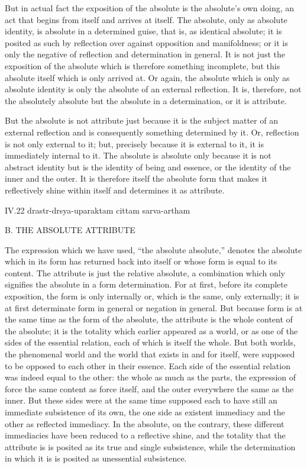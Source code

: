 But in actual fact
the exposition of the absolute
is the absolute's own doing,
an act that begins from itself
and arrives at itself.
The absolute, only as absolute identity,
is absolute in a determined guise,
that is, as identical absolute;
it is posited as such by reflection
over against opposition and manifoldness;
or it is only the negative of
reflection and determination in general.
It is not just the exposition of the absolute
which is therefore something incomplete,
but this absolute itself
which is only arrived at.
Or again, the absolute
which is only as absolute identity
is only the absolute of an external reflection.
It is, therefore, not the absolutely absolute
but the absolute in a determination,
or it is attribute.

But the absolute is not attribute just because
it is the subject matter of an external reflection
and is consequently something determined by it.
Or, reflection is not only external to it;
but, precisely because it is external to it,
it is immediately internal to it.
The absolute is absolute only because
it is not abstract identity
but is the identity of being and essence,
or the identity of the inner and the outer.
It is therefore itself the absolute form
that makes it reflectively shine within itself
and determines it as attribute.

IV.22
drastr-drsya-uparaktam cittam sarva-artham

B. THE ABSOLUTE ATTRIBUTE

The expression which we have used, “the absolute absolute,”
denotes the absolute which in its form
has returned back into itself
or whose form is equal to its content.
The attribute is just the relative absolute,
a combination which only signifies the absolute
in a form determination.
For at first, before its complete exposition,
the form is only internally
or, which is the same, only externally;
it is at first determinate form in general
or negation in general.
But because form is at the same time
as the form of the absolute,
the attribute is the whole content of the absolute;
it is the totality which earlier appeared as a world,
or as one of the sides of the essential relation,
each of which is itself the whole.
But both worlds, the phenomenal world
and the world that exists in and for itself,
were supposed to be opposed
to each other in their essence.
Each side of the essential relation was
indeed equal to the other:
the whole as much as the parts,
the expression of force the same content
as force itself,
and the outer everywhere the same as the inner.
But these sides were at the same time
supposed each to have still
an immediate subsistence of its own,
the one side as existent immediacy
and the other as reflected immediacy.
In the absolute, on the contrary,
these different immediacies have been
reduced to a reflective shine,
and the totality that the attribute is
is posited as its true and single subsistence,
while the determination in which it is
is posited as unessential subsistence.

